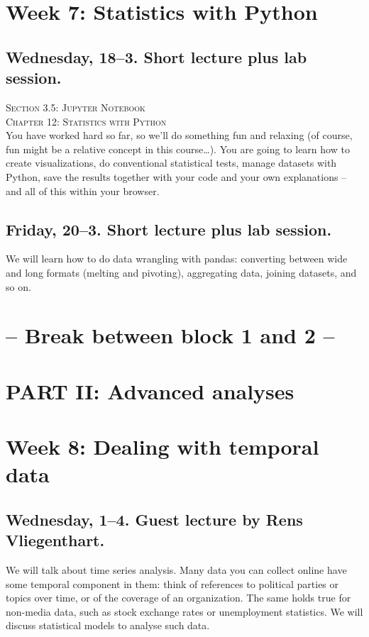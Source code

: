 \section*{Week 7: Statistics with Python}

\subsection*{Wednesday, 18--3. Short lecture plus lab session.}
\textsc{ Section 3.5: Jupyter Notebook}\\
\textsc{ Chapter 12: Statistics with Python}\\
You have worked hard so far, so we'll do something fun and relaxing (of course, fun might be a relative concept in this course\ldots). You are going to learn how to create visualizations, do conventional statistical tests, manage datasets with Python, save the results together with your code and your own explanations -- and all of this within your browser.



\subsection*{Friday, 20--3.  Short lecture plus lab session.}
We will learn how to do data wrangling with pandas: converting between wide and long formats (melting and pivoting), aggregating data, joining datasets, and so on.


\section*{-- Break between block 1 and 2 -- }

\section*{PART II: Advanced analyses}


\section*{Week 8: Dealing with temporal data}

\subsection*{Wednesday, 1--4. Guest lecture by Rens Vliegenthart.}
We will talk about time series analysis. Many data you can collect online have some temporal component in them: think of references to political parties or topics over time, or of the coverage of an organization. The same holds true for non-media data, such as stock exchange rates or unemployment statistics. We will discuss statistical models to analyse such data.


